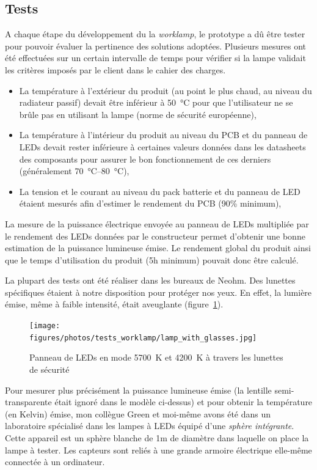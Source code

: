 \documentclass[a4paper, 12pt, sffamily]{report}
\begin{document}
\subsection{Tests}
A chaque étape du développement du la \emph{worklamp}, le prototype a dû  être tester pour pouvoir évaluer la pertinence des solutions adoptées. Plusieurs mesures ont été effectuées sur un certain intervalle de temps pour vérifier si la lampe validait les critères imposés par le client dans le cahier des charges.
\begin{itemize} %
\item La température à l'extérieur du produit (au point le plus chaud, au niveau du radiateur passif) devait être inférieur à \SI{50}{\celsius} pour que l'utilisateur ne se brûle pas en utilisant la lampe (norme de sécurité européenne),
\item La température à l'intérieur du produit au niveau du PCB et du panneau de LEDs devait rester inférieure à certaines valeurs données dans les datasheets des composants pour assurer le bon fonctionnement de ces derniers (généralement \SIrange{70}{80}{\celsius}),
\item La tension et le courant au niveau du pack batterie et du panneau de LED étaient mesurés afin d'estimer le rendement du PCB (90\% minimum),
\end{itemize}
La mesure de la puissance électrique envoyée au panneau de LEDs multipliée par le rendement des LEDs données par le constructeur permet d'obtenir une bonne estimation de la puissance lumineuse émise. Le rendement global du produit ainsi que le temps d'utilisation du produit (5h minimum) pouvait donc être calculé.

La plupart des tests ont été réaliser dans les bureaux de Neohm. Des lunettes spécifiques étaient à notre disposition pour protéger nos yeux. En effet, la lumière émise, même à faible intensité, était aveuglante (figure~\ref{fig:lamp_with_glasses}).

\begin{figure}[h]
\centering
\texttt{[image: figures/photos/tests\_worklamp/lamp\_with\_glasses.jpg]}
\caption{Panneau de LEDs en mode \SI{5700}{\kelvin} et \SI{4200}{\kelvin} à travers les lunettes de sécurité}
\label{fig:lamp_with_glasses}
\end{figure}

Pour mesurer plus précisément la puissance lumineuse émise (la lentille semi-transparente était ignoré dans le modèle ci-dessus) et pour obtenir la température (en Kelvin) émise, mon collègue Green et moi-même avons été dans un laboratoire spécialisé dans les lampes à LEDs équipé d'une \emph{sphère intégrante}. Cette appareil est un sphère blanche de 1m de diamètre dans laquelle on place la lampe à tester. Les capteurs sont reliés à une grande armoire électrique elle-même connectée à un ordinateur.
\end{document}
